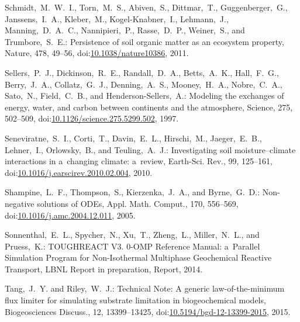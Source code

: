 \documentclass[gmdd, online, hvmath]{copernicus}
\begin{document}
\begin{thebibliography}{55}
Schmidt,~M.~W.~I., Torn,~M.~S., Abiven,~S., Dittmar,~T., Guggenberger,~G., Janssens,~I.~A., Kleber,~M., Kogel-Knabner,~I., Lehmann,~J., Manning,~D.~A.~C., Nannipieri,~P., Rasse,~D.~P., Weiner,~S., and Trumbore,~S.~E.:
Persistence of soil organic matter as an ecosystem property,
Nature,
478, 49--56,
doi:\href{http://dx.doi.org/10.1038/nature10386}{10.1038/nature10386}, 2011.


Sellers,~P.~J., Dickinson,~R.~E., Randall,~D.~A., Betts,~A.~K., Hall,~F.~G., Berry,~J.~A., Collatz,~G.~J., Denning,~A.~S., Mooney,~H.~A., Nobre,~C.~A., Sato,~N., Field,~C.~B., and Henderson-Sellers,~A.:
Modeling the exchanges of energy, water, and carbon between continents and the atmosphere,
Science,
275, 502--509,
doi:\href{http://dx.doi.org/10.1126/science.275.5299.502}{10.1126/science.275.5299.502}, 1997.


Seneviratne,~S.~I., Corti,~T., Davin,~E.~L., Hirschi,~M., Jaeger,~E.~B., Lehner,~I., Orlowsky,~B., and Teuling,~A.~J.:
Investigating soil moisture--climate interactions in a~changing climate: a~review,
Earth-Sci. Rev.,
99, 125--161,
doi:\href{http://dx.doi.org/10.1016/j.earscirev.2010.02.004}{10.1016/j.earscirev.2010.02.004}, 2010.


Shampine,~L.~F., Thompson,~S., Kierzenka,~J.~A., and Byrne,~G.~D.:
Non-negative solutions of ODEs,
Appl. Math. Comput.,
170, 556--569,
doi:\href{http://dx.doi.org/10.1016/j.amc.2004.12.011}{10.1016/j.amc.2004.12.011}, 2005.


Sonnenthal,~E.~L., Spycher,~N., Xu,~T., Zheng,~L., Miller,~N.~L., and Pruess,~K.:
TOUGHREACT V3. 0-OMP Reference Manual: a~Parallel Simulation Program for Non-Isothermal Multiphase Geochemical Reactive Transport,
LBNL Report in preparation, Report,
 2014.





Tang,~J.~Y. and Riley,~W.~J.: Technical Note: A generic law-of-the-minimum flux limiter for   simulating substrate limitation in biogeochemical models, Biogeosciences Discuss., 12, 13399--13425,
doi:\href{http://dx.doi.org/10.5194/bgd-12-13399-2015}{10.5194/bgd-12-13399-2015}, 2015.



\end{thebibliography}
\end{document}
